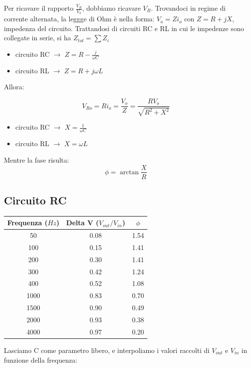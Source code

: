 Per ricavare il rapporto $\frac{V_{R}}{V_{o}}$, dobbiamo ricavare $V_R$. Trovandoci in regime di corrente alternata, la leggge di Ohm è nella forma: $ V_o = Zi_o$ con $Z = R + jX$, impedenza del circuito.
Trattandosi di circuiti RC e RL in cui le impedenze sono collegate in serie, si ha $Z_{tot} = \sum Z_i$

\begin{itemize}
\item circuito RC $\rightarrow$ $Z=R-\frac{j}{\omega C}$
\item circuito RL $\rightarrow$ $Z=R+j\omega L$
\end{itemize}  

Allora: 

$$V_{Ro} = Ri_o = \frac{V_o}{Z} = \frac{RV_o}{\sqrt{R^2+X^2}} $$ 


\begin{itemize}
\item circuito RC $\rightarrow$ $X=\frac{1}{\omega C}$
\item circuito RL $\rightarrow$ $X=\omega L$
\end{itemize}

Mentre la fase risulta: 
$$\phi = \arctan \frac{X}{R} $$


\subsection{Circuito RC}


\begin{center}

\begin{tabular}{*{3}{c}}
Frequenza ($Hz$) & Delta V ($V_{out}/V_{in}$) & $\phi$ \\
\midrule
50 & 0.08 & 1.54\\
100 & 0.15 & 1.41\\
200 & 0.30 & 1.41\\
300 & 0.42 & 1.24\\
400 & 0.52 & 1.08 \\
1000 & 0.83 & 0.70\\
1500 & 0.90 & 0.49\\
2000 & 0.93 & 0.38\\
4000 & 0.97 & 0.20 \\
\end{tabular}
\end{center}

Lasciamo C come parametro libero, e interpoliamo i valori raccolti di $V_{out}$ e $V_{in}$ in funzione della frequenza:

